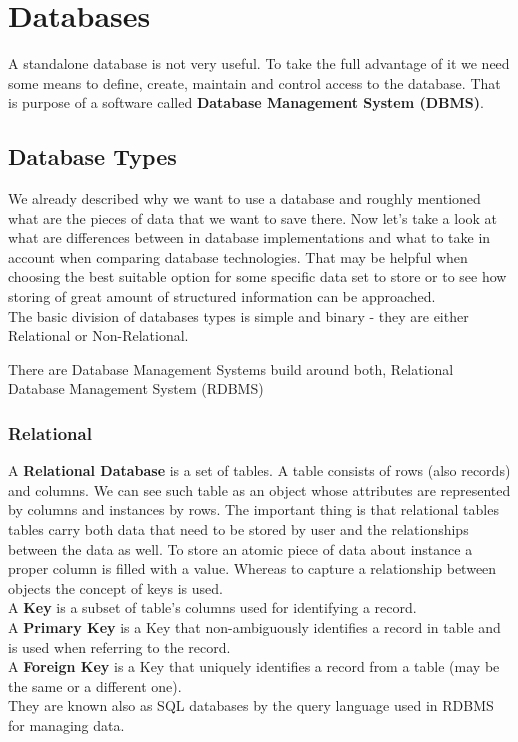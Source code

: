 \chapter{Databases}

A standalone database is not very useful. To take the full advantage of it we need some means to define, create, maintain and control access to the database. That is purpose of a software called \textbf{Database Management System (DBMS)}.

\section{Database Types}

We already described why we want to use a database and roughly mentioned what are the pieces of data that we want to save there. 
Now let's take a look at what are differences between in database implementations and what to take in account when comparing database technologies.
That may be helpful when choosing the best suitable option for some specific data set to store or to see how storing of great amount of structured information can be approached. \\ 

The basic division of databases types is simple and binary - they are either Relational or Non-Relational.

There are Database Management Systems build around both, Relational Database Management System (RDBMS)

\subsection{Relational}
A \textbf{Relational Database} is a set of tables. A table consists of rows (also records) and columns. We can see such table as an object whose attributes are represented by columns and instances by rows. 
The important thing is that relational tables tables carry both data that need to be stored by user and the relationships between the data as well. 
To store an atomic piece of data about instance a proper column is filled with a value.
Whereas to capture a relationship between objects the concept of keys is used. \\
A \textbf{Key} is a subset of table's columns used for identifying a record. \\
A \textbf{Primary Key} is a Key that non-ambiguously identifies a record in table and is used when referring to the record. \\
A \textbf{Foreign Key} is a Key that uniquely identifies a record from a table (may be the same or a different one). \\
They are known also as SQL databases by the query language used in RDBMS for managing data.


